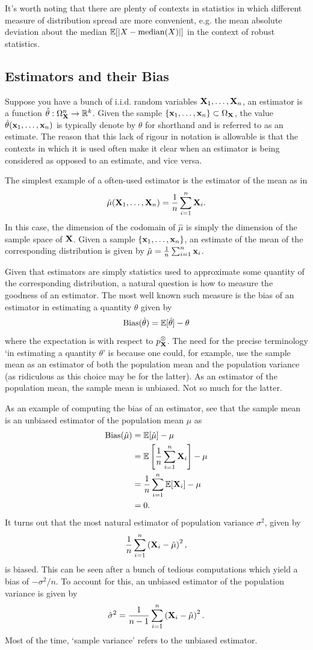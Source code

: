 \documentclass[11pt]{article}
\begin{document}
\begin{appendices}
It's worth noting that there are plenty of contexts in statistics in which different measure of distribution spread are more convenient, e.g. the mean absolute deviation about the median $\mathbb{E}[|X-\text{median}(X)|]$ in the context of robust statistics.

\subsection{Estimators and their Bias}
Suppose you have a bunch of i.i.d. random variables $\mathbf{X}_1,\dots,\mathbf{X}_n$, an estimator is a function $\hat{\theta}:\Omega_{\mathbf{X}}^n\to\mathbb{R}^k$. Given the sample $\{\mathbf{x}_1,\dots,\mathbf{x}_n\}\subset\Omega_{\mathbf{X}}$, the value $\hat{\theta}(\mathbf{x}_1,\dots,\mathbf{x}_n)$ is typically denote by $\hat{\theta}$ for shorthand and is referred to as an estimate. The reason that this lack of rigour in notation is allowable is that the contexts in which it is used often make it clear when an estimator is being considered as opposed to an estimate, and vice versa.

The simplest example of a often-used estimator is the estimator of the mean as in
$$
\hat{\mu}(\mathbf{X}_1,\dots,\mathbf{X}_n)
=
\frac{1}{n}\sum_{i=1}^n \mathbf{X}_i.
$$
In this case, the dimension of the codomain of $\hat{\mu}$ is simply the dimension of the sample space of $\mathbf{X}$. Given a sample $\{\mathbf{x}_1,\dots,\mathbf{x}_n\}$, an estimate of the mean of the corresponding distribution is given by $\hat{\mu}=\frac{1}{n}\sum_{i=1}^n\mathbf{x}_i$.

Given that estimators are simply statistics used to approximate some quantity of the corresponding distribution, a natural question is how to measure the goodness of an estimator. The most well known such measure is the bias of an estimator in estimating a quantity $\theta$ given by
$$
\text{Bias}(\hat{\theta})
=
\mathbb{E}[\hat{\theta}]-\theta
$$
where the expectation is with respect to $p_{\mathbf{X}}^{\otimes}$. The need for the precise terminology `in estimating a quantity $\theta$' is because one could, for example, use the sample mean as an estimator of both the population mean and the population variance (as ridiculous as this choice may be for the latter). As an estimator of the population mean, the sample mean is unbiased. Not so much for the latter.

As an example of computing the bias of an estimator, see that the sample mean is an unbiased estimator of the population mean $\mu$ as
\begin{align*}
    \text{Bias}(\hat{\mu})
    &=
    \mathbb{E}[\hat{\mu}]-\mu\\
    &=
    \mathbb{E}\left[\frac{1}{n}\sum_{i=1}^n\mathbf{X}_i\right]-\mu\\
    &=
    \frac{1}{n}\sum_{i=1}^n\mathbb{E}[\mathbf{X}_i]-\mu\\
    &=
    0.
\end{align*}
It turns out that the most natural estimator of population variance $\sigma^2$, given by
$$
\frac{1}{n}\sum_{i=1}^n\left(\mathbf{X}_i-\hat{\mu}\right)^2,
$$
is biased. This can be seen after a bunch of tedious computations which yield a bias of $-\sigma^2/n$. To account for this, an unbiased estimator of the population variance is given by
$$
\hat{\sigma}^2
=
\frac{1}{n-1}\sum_{i=1}^n\left(\mathbf{X}_i-\hat{\mu}\right)^2.
$$
Most of the time, `sample variance' refers to the unbiased estimator.


\end{appendices}
\end{document}
